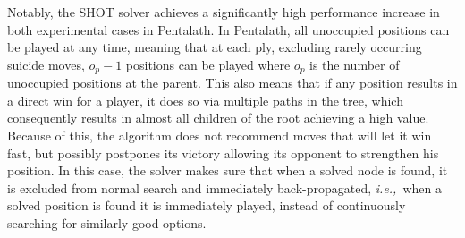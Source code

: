 \documentclass{icga}
\newcommand{\ie}{{\it i.e.,}~}
\begin{document}
Notably, the SHOT solver achieves a significantly high performance increase in both experimental cases in Pentalath. In Pentalath, all unoccupied positions can be played at any time, meaning that at each ply, excluding rarely occurring suicide moves, $o_p-1$ positions can be played where $o_p$ is the number of unoccupied positions at the parent. This also means that if any position results in a direct win for a player, it does so via multiple paths in the tree, which consequently results in almost all children of the root achieving a high value. Because of this, the algorithm does not recommend moves that will let it win fast, but possibly postpones its victory allowing its opponent to strengthen his position. In this case, the solver makes sure that when a solved node is found, it is excluded from normal search and immediately back-propagated, \ie when a solved position is found it is immediately played, instead of continuously searching for similarly good options.

\begin{table}[ht]
\centering
\tabcolsep=0.3cm
\vspace{3mm}
{\caption[H-MCTS Solver vs. MCTS-Solver.]{H-MCTS Solver vs. MCTS-Solver, random play-outs.\\ Win percentages with respect to H-MCTS, 2,000 games.} \label{tab:uct-s_hmcts-s}}
\end{table}
\end{document}
